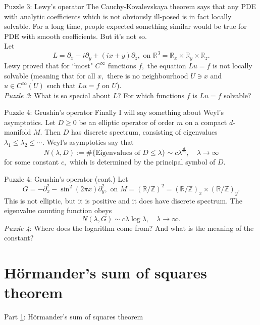 \documentclass{beamer}
\numberwithin{equation}{section}
\theoremstyle{plain}
\theoremstyle{plain}
\theoremstyle{definition}
\theoremstyle{plain}
\theoremstyle{plain}
\theoremstyle{definition}
\newcommand{\Rl}{\mathbb{R}}
\newcommand{\Itgr}{\mathbb{Z}}
\begin{document}
\begin{frame}{Puzzle 3: Lewy's operator}
The Cauchy-Kovalevskaya theorem says that any PDE with analytic coefficients which is not obviously ill-posed is in fact locally solvable.
For a long time, people expected something similar would be true for PDE with smooth coefficients. But it's not so.\pause \\ Let
\[
    L = \partial_x-i\partial_y+(ix+y)\partial_z,\text{ on }\Rl^3 = \Rl_x\times \Rl_y\times \Rl_z.
\]
Lewy proved that for ``most" $C^{\infty}$ functions $f,$ the equation $Lu=f$ is not locally solvable (meaning that for all $x,$ there is no neighbourhood
$U\ni x$ and $u\in C^{\infty}(U)$ such that $Lu=f$ on $U$).\\
\emph{Puzzle 3}: What is so special about $L$? For which functions $f$ is $Lu=f$ solvable?
\end{frame}

\begin{frame}{Puzzle 4: Grushin's operator}
    Finally I will say something about Weyl's asymptotics. Let $D\geq 0$ be an elliptic operator of order $m$ on a compact $d$-manifold $M.$ Then $D$ has discrete spectrum, consisting of eigenvalues $\lambda_1\leq \lambda_2\leq \cdots.$ Weyl's asymptotics say that
    \[
        N(\lambda,D) := \#\{\text{Eigenvalues of }D\leq \lambda\} \sim c\lambda^{\frac{d}{m}},\quad \lambda\to\infty
    \]
    for some constant $c,$ which is determined by the principal symbol of $D.$
\end{frame}

\begin{frame}{Puzzle 4: Grushin's operator (cont.)}
    Let
    \[
        G = -\partial_x^2-\sin^2(2\pi x)\partial_y^2,\text{ on }M=(\Rl/\Itgr)^2 = (\Rl/\Itgr)_x\times (\Rl/\Itgr)_y.
    \]
    This is not elliptic, but it is positive and it does have discrete spectrum. The eigenvalue counting function obeys
    \[
        N(\lambda,G) \sim c\lambda\log\lambda,\quad \lambda\to\infty.
    \]
    \emph{Puzzle 4}: Where does the logarithm come from? And what is the meaning of the constant?
\end{frame}

\section{H\"ormander's sum of squares theorem}\label{Hormander_section}

\begin{frame}
    \Huge{Part \ref{Hormander_section}: H\"ormander's sum of squares theorem}
\end{frame}
\end{document}
